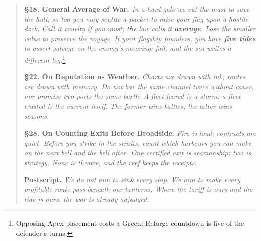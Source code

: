 \documentclass[11pt]{article}
\begin{document}
\begin{quote}
\medskip
\textbf{§18. General Average of War.} \emph{In a hard gale we cut the mast to save the hull; so too you may scuttle a packet to raise your flag upon a hostile dock. Call it cruelty if you must; the law calls it \textbf{average}. Lose the smaller value to preserve the voyage.} \emph{If your flagship founders, you have \textbf{five tides} to assert salvage on the enemy’s mooring; fail, and the sea writes a different log.}\footnote{Opposing-Apex placement costs a Green; Reforge countdown is five of the defender’s turns.}

\medskip
\textbf{§22. On Reputation as Weather.} \emph{Charts are drawn with ink; routes are drawn with memory. Do not bar the same channel twice without cause, nor promise two ports the same berth. A fleet feared is a storm; a fleet trusted is the current itself. The former wins battles; the latter wins seasons.}

\medskip
\textbf{§28. On Counting Exits Before Broadside.} \emph{Fire is loud; contracts are quiet. Before you strike in the straits, count which harbours you can make on the next bell and the bell after. One certified exit is seamanship; two is strategy. None is theatre, and the reef keeps the receipts.}

\medskip
\textbf{Postscript.} \emph{We do not aim to sink every ship. We aim to make every profitable route pass beneath our lanterns. Where the tariff is ours and the tide is ours, the war is already adjudged.}
\end{quote}

\clearpage
\end{document}
